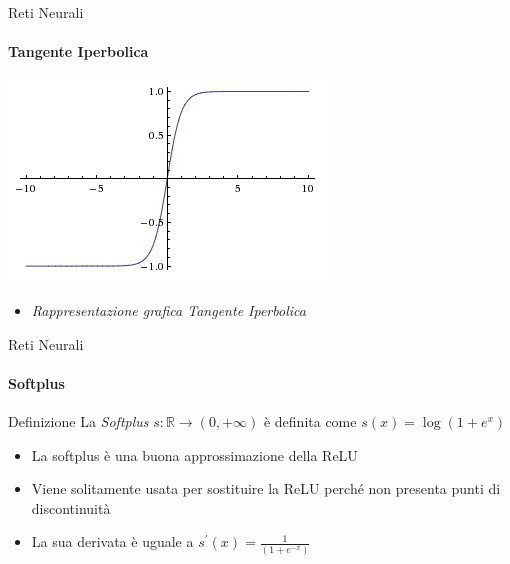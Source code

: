 \documentclass[
 ]{beamer}
\begin{document}
\begin{frame}{Reti Neurali}
    \framesubtitle{Tangente Iperbolica}
    
    \begin{center}
      \includegraphics[scale = 0.6]{tanh.jpeg}
    \end{center}
  
    \bigskip 
  
  \begin{itemize}
    \setlength\itemsep{1em}
    \item[] \large \emph{Rappresentazione grafica Tangente Iperbolica}
  \end{itemize}       
\end{frame} 

\begin{frame}{Reti Neurali}
    \framesubtitle{Softplus}
    \begin{block}{Definizione} 
        \large La \emph{Softplus} $s: \mathbb{R} \rightarrow (0, +\infty)$ è definita come $s(x) = \log(1 + e^x)$ 
    \end{block}\pause
    
    \bigskip
    
    \begin{itemize} [<+->]
        \setlength\itemsep{2em}
        \item \large La softplus è una buona approssimazione della ReLU
        \item \large Viene solitamente usata per sostituire la ReLU perché non presenta punti di discontinuità
        \item \large La sua derivata è uguale a $s^{\prime}(x) = \frac{1}{(1 + e^{-x})}$
    \end{itemize}
\end{frame}
\end{document}
